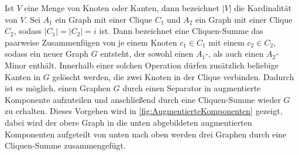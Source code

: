 Ist $V$ eine Menge von Knoten oder Kanten, dann bezeichnet $\vert V \vert$ die Kardinalität von $V$.
Sei $A_1$ ein Graph mit einer Clique $C_1$ und $A_2$ ein Graph mit einer Clique $C_2$, sodass $\vert C_1 \vert = \vert C_2 \vert = i$ ist.
Dann bezeichnet eine Cliquen-Summe das paarweise Zusammenfügen von je einem Knoten $c_1 \in C_1$ mit einem $c_2 \in C_2$, sodass ein neuer Graph $G$ entsteht, der sowohl einen $A_1$-, als auch einen $A_2$-Minor enthält.
Innerhalb einer solchen Operation dürfen zusätzlich beliebige Kanten in $G$ gelöscht werden, die zwei Knoten in der Clique verbinden.
Dadurch ist es möglich, einen Graphen $G$ durch einen Separator in augmentierte Komponente aufzuteilen und anschließend durch eine Cliquen-Summe wieder $G$ zu erhalten.
Dieses Vorgehen wird in \Abb \ref{fig:AugmentierteKomponenten} gezeigt, dabei wird der obere Graph in die unten abgebildeten augmentierten Komponenten aufgeteilt \bzw von unten nach oben werden drei Graphen durch eine Cliquen-Summe zusammengefügt.
